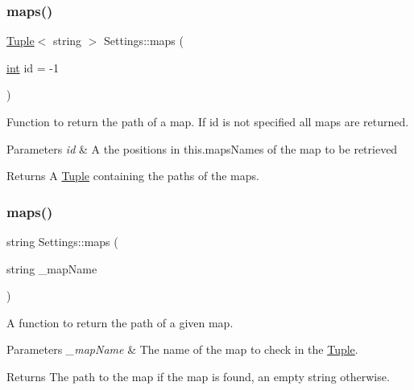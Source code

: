 \subsubsection{\texorpdfstring{maps()}{maps()}\hspace{0.1cm}{\footnotesize\ttfamily [2/4]}}
{\footnotesize\ttfamily \mbox{\hyperlink{class_tuple}{Tuple}}$<$ string $>$ Settings\+::maps (\begin{DoxyParamCaption}\item[{\mbox{\hyperlink{draw_8hh_aa620a13339ac3a1177c86edc549fda9b}{int}}}]{id = {\ttfamily -\/1} }\end{DoxyParamCaption})}



Function to return the path of a map. If id is not specified all maps are returned. 


\begin{DoxyParams}{Parameters}
{\em id} & A the positions in this.\+maps\+Names of the map to be retrieved \\
\hline
\end{DoxyParams}
\begin{DoxyReturn}{Returns}
A \mbox{\hyperlink{class_tuple}{Tuple}} containing the paths of the maps. 
\end{DoxyReturn}
\mbox{\label{class_settings_aa34e6004beffad1bc5fd81f99353d3e1}} 
\subsubsection{\texorpdfstring{maps()}{maps()}\hspace{0.1cm}{\footnotesize\ttfamily [3/4]}}
{\footnotesize\ttfamily string Settings\+::maps (\begin{DoxyParamCaption}\item[{string}]{\+\_\+map\+Name }\end{DoxyParamCaption})}



A function to return the path of a given map. 


\begin{DoxyParams}{Parameters}
{\em \+\_\+map\+Name} & The name of the map to check in the \mbox{\hyperlink{class_tuple}{Tuple}}. \\
\hline
\end{DoxyParams}
\begin{DoxyReturn}{Returns}
The path to the map if the map is found, an empty string otherwise. 
\end{DoxyReturn}
\mbox{\label{class_settings_ab638c9895f57ed5e8ab64084752c660d}} 
